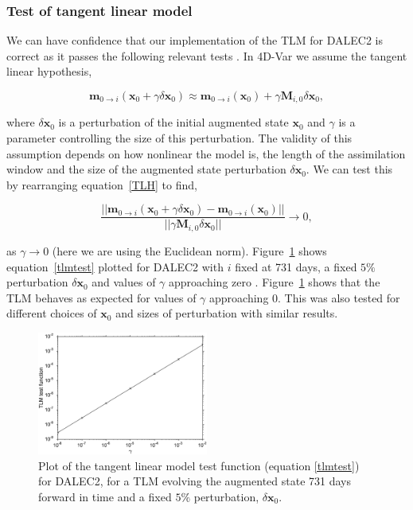 \documentclass[review]{elsarticle}
\begin{document}
\subsubsection{Test of tangent linear model} \label{sec:testtlm}

We can have confidence that our implementation of the TLM for DALEC2 is correct as it passes the following relevant tests \citep{Li1994}. In 4D-Var we assume the tangent linear hypothesis,
\begin{linenomath}
\begin{equation}
\textbf{m}_{0\rightarrow i}(\mathbf{x}_0+\gamma \delta\mathbf{x}_0) \approx \textbf{m}_{0 \rightarrow i}(\mathbf{x}_0) +\gamma \mathbf{M}_{i,0} \delta\mathbf{x}_0, \label{TLH}
\end{equation}
\end{linenomath}
where $\delta\mathbf{x}_0$ is a perturbation of the initial augmented state $\textbf{x}_{0}$ and $\gamma$ is a parameter controlling the size of this perturbation. The validity of this assumption depends on how nonlinear the model is, the length of the assimilation window and the size of the augmented state perturbation $\delta\mathbf{x}_0$. We can test this by rearranging equation~\eqref{TLH} to find,
\begin{linenomath}
\begin{equation}
\frac{||\textbf{m}_{0\rightarrow i}(\mathbf{x}_0+\gamma \delta\mathbf{x}_0) - \textbf{m}_{0 \rightarrow i}(\mathbf{x}_0)||}{||\gamma\mathbf{M}_{i,0}\delta\mathbf{x}_0||} \rightarrow 0, \label{tlmtest}
\end{equation}
\end{linenomath}
as $\gamma \rightarrow 0$ (here we are using the Euclidean norm). Figure~\ref{fig:tlm} shows equation~\eqref{tlmtest} plotted for DALEC2 with $i$ fixed at 731 days, a fixed $5\%$ perturbation $\delta\mathbf{x}_0$ and values of $\gamma$ approaching zero . Figure~\ref{fig:tlm} shows that the TLM behaves as expected for values of $\gamma$ approaching $0$. This was also tested for different choices of $\textbf{x}_{0}$ and sizes of perturbation with similar results.


\begin{figure}[ht]
    \centering
    \includegraphics[width=0.5\textwidth]{linmoderr.eps}
    \caption{Plot of the tangent linear model test function (equation \eqref{tlmtest}) for DALEC2, for a TLM evolving the augmented state 731 days forward in time and a fixed $5\%$ perturbation, $\delta \textbf{x}_0$.}
    \label{fig:tlm}
\end{figure}
\end{document}
